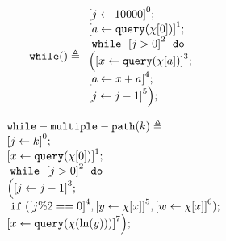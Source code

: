             \begin{example}
                \[
                \kw{while}() \triangleq
                \begin{array}{l}
                    \clabel{ \assign{j}{10000} }^{0} ; \\
                    \clabel{ \assign{a}{\query(\chi[0])} }^{1} ; \\
                        \ewhile ~ \clabel{j > 0}^{2} ~ \edo ~ \\
                        \Big(
                         \clabel{\assign{x}{\query(\chi[a]) }}^{3}  ; \\
                         \clabel{\assign{a}{x + a}}^{4} ;\\
                        \clabel{\assign{j}{j-1}}^{5}       \Big);
                    \end{array}
                \]
                \end{example}
%
        \begin{example}
        \[
        \begin{array}{l}
        \kw{while-multiple-path}(k) \triangleq \\
            \clabel{ \assign{j}{k}}^{0} ; \\
            \clabel{ \assign{x}{\query(\chi[0])} }^{1} ; \\
                \ewhile ~ \clabel{j > 0}^{2} ~ \edo ~ \\
                \Big(
                 \clabel{\assign{j}{j-1}}^{3} ;\\
                 \eif(\clabel{j \% 2 == 0}^{4}, 
                 \clabel{\assign{y}{\chi[x]}}^{5}, 
                 \clabel{\assign{w}{\chi[x]}}^{6}) ;\\                            
                 \clabel{\assign{x}{\query(\chi(\ln(y)))} }^{7} \Big);
            \end{array}
        \]
        \end{example}
%
